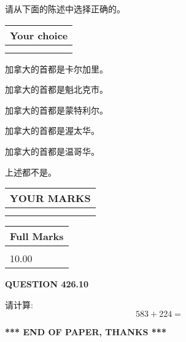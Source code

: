 \documentclass{ctexart}
\begin{document}
  
请从下面的陈述中选择正确的。
  
  
\noindent\hspace{3.0in} \begin{tabular}{|l|}
\hline
Your choice \\
\hline
 \\ 
 \\ 
\hline
\end{tabular}
  
  
 
 
加拿大的首都是卡尔加里。
 
 
加拿大的首都是魁北克市。
 
 
加拿大的首都是蒙特利尔。
 
 
加拿大的首都是渥太华。
 
 
加拿大的首都是温哥华。
 
 
 上述都不是。
 
 
  
\vspace{0.2in}
  
\noindent\begin{tabular}{|l|}
\hline
 YOUR MARKS  \\
\hline
 \\ 
 \\ 
\hline
\end{tabular}
\hspace{0.05in} \begin{tabular}{|l|}
\hline
 Full Marks  \\
\hline
 \\ 
10.00 \\
\hline
\end{tabular}
{\textbf{\Large{QUESTION
426.10 
}}}
  
  
 
请计算:
\begin{equation}
583 +  %
224 = \nonumber
\end{equation}
 

 

 
   
   
 \vspace{0.2in}
 
   
   
   
   
\vspace{1.0in} 
{\textbf{\large{ *** END OF PAPER, THANKS *** }}} 
   
\end{document}
